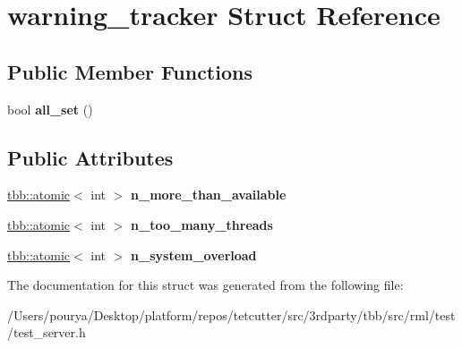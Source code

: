 \hypertarget{structwarning__tracker}{}\section{warning\+\_\+tracker Struct Reference}
\label{structwarning__tracker}
\subsection*{Public Member Functions}
\begin{DoxyCompactItemize}
\item 
\hypertarget{structwarning__tracker_af368c1c033f7178444e87f45c9a9555a}{}bool {\bfseries all\+\_\+set} ()\label{structwarning__tracker_af368c1c033f7178444e87f45c9a9555a}

\end{DoxyCompactItemize}
\subsection*{Public Attributes}
\begin{DoxyCompactItemize}
\item 
\hypertarget{structwarning__tracker_aaaa03376ab9805b1a254b0ba8f1bf488}{}\hyperlink{structtbb_1_1atomic}{tbb\+::atomic}$<$ int $>$ {\bfseries n\+\_\+more\+\_\+than\+\_\+available}\label{structwarning__tracker_aaaa03376ab9805b1a254b0ba8f1bf488}

\item 
\hypertarget{structwarning__tracker_af110e1980a9498541acba8f4d10cfe65}{}\hyperlink{structtbb_1_1atomic}{tbb\+::atomic}$<$ int $>$ {\bfseries n\+\_\+too\+\_\+many\+\_\+threads}\label{structwarning__tracker_af110e1980a9498541acba8f4d10cfe65}

\item 
\hypertarget{structwarning__tracker_a5d665bd2d84e06c20c273cc3d6a9c85c}{}\hyperlink{structtbb_1_1atomic}{tbb\+::atomic}$<$ int $>$ {\bfseries n\+\_\+system\+\_\+overload}\label{structwarning__tracker_a5d665bd2d84e06c20c273cc3d6a9c85c}

\end{DoxyCompactItemize}


The documentation for this struct was generated from the following file\+:\begin{DoxyCompactItemize}
\item 
/\+Users/pourya/\+Desktop/platform/repos/tetcutter/src/3rdparty/tbb/src/rml/test/test\+\_\+server.\+h\end{DoxyCompactItemize}
